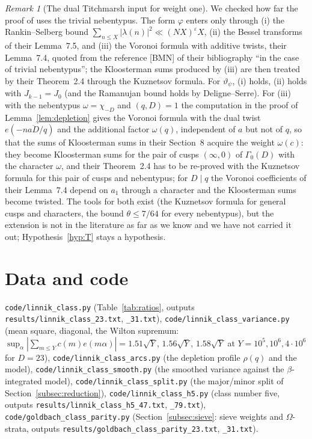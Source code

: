 ﻿\documentclass[11pt]{amsart}
\theoremstyle{remark}
\newtheorem{remark}[theorem]{Remark}
\newcommand{\vt}{\vartheta}
\newcommand{\e}{\varepsilon}
\begin{document}
\begin{remark}[The dual Titchmarsh input for weight one]\label{rem:ABL}
We checked how far the proof of \cite[Theorem~1.3]{ABL} uses the trivial nebentypus. The form $\varphi$ enters only through (i) the Rankin--Selberg bound $\sum_{n\le X}|\lambda(n)|^2\ll(NX)^\e X$, (ii) the Bessel transforms of their Lemma~7.5, and (iii) the Voronoi formula with additive twists, their Lemma~7.4, quoted from the reference [BMN] of their bibliography ``in the case of trivial nebentypus''; the Kloosterman sums produced by (iii) are then treated by their Theorem~2.4 through the Kuznetsov formula. For $\vt_\psi$, (i) holds, (ii) holds with $J_{k-1}=J_0$ (and the Ramanujan bound holds by Deligne--Serre). For (iii) with the nebentypus $\omega=\chi_{-D}$ and $(q,D)=1$ the computation in the proof of Lemma~\ref{lem:depletion} gives the Voronoi formula with the dual twist $e(-n\overline{aD}/q)$ and the additional factor $\omega(q)$, independent of $a$ but not of $q$, so that the sums of Kloosterman sums in their Section~8 acquire the weight $\omega(c)$: they become Kloosterman sums for the pair of cusps $(\infty,0)$ of $\Gamma_0(D)$ with the character $\omega$, and their Theorem~2.4 has to be re-proved with the Kuznetsov formula for this pair of cusps and nebentypus; for $D\mid q$ the Voronoi coefficients of their Lemma~7.4 depend on $a_1$ through a character and the Kloosterman sums become twisted. The tools for both exist (the Kuznetsov formula for general cusps and characters, the bound $\theta\le7/64$ for every nebentypus), but the extension is not in the literature as far as we know and we have not carried it out; Hypothesis~\ref{hyp:T} stays a hypothesis.
\end{remark}

\section*{Data and code}
{\raggedright \texttt{code/linnik\_class.py} (Table~\ref{tab:ratios}, outputs \texttt{results/linnik\_class\_23.txt}, \texttt{\_31.txt}), \texttt{code/linnik\_class\_variance.py} (mean square, diagonal, the Wilton supremum: $\sup_\alpha|\sum_{m\le Y}c(m)e(m\alpha)|=1.51\sqrt Y$, $1.56\sqrt Y$, $1.58\sqrt Y$ at $Y=10^5,10^6,4\cdot10^6$ for $D=23$), \texttt{code/linnik\_class\_arcs.py} (the depletion profile $\rho(q)$ and the model), \texttt{code/linnik\_class\_smooth.py} (the smoothed variance against the $\beta$-integrated model), \texttt{code/linnik\_class\_split.py} (the major/minor split of Section~\ref{subsec:reduction}), \texttt{code/linnik\_class\_h5.py} (class number five, outputs \texttt{results/linnik\_class\_h5\_47.txt}, \texttt{\_79.txt}), \texttt{code/goldbach\_class\_parity.py} (Section~\ref{subsec:sieve}: sieve weights and $\Omega$-strata, outputs \texttt{results/goldbach\_class\_parity\_23.txt}, \texttt{\_31.txt}).\par}
\end{document}
